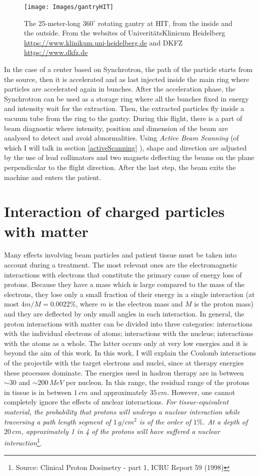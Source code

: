 \documentclass[12pt, a4paper, twoside]{book}
\begin{document}
\begin{figure}[t]
\texttt{[image: Images/gantryHIT]}
\caption{The 25-meter-long $360^\circ$ rotating gantry at HIT, from the inside and the outside. From the websites of Univerit\"atsKlinicum Heidelberg \url{https://www.klinikum.uni-heidelberg.de} and DKFZ \url{https://www.dkfz.de}}
\label{fig:HIT}
\end{figure}

In the case of a center based on Synchrotron, the path of the particle starts from the source, then it is accelerated and as last injected inside the main ring where particles are accelerated again in bunches. After the acceleration phase, the Synchrotron can be used as a storage ring where all the bunches fixed in energy and intensity wait for the extraction. Then, the extracted particles fly inside a vacuum tube from the ring to the gantry. During this flight, there is a part of beam diagnostic where intensity, position and dimension of the beam are analysed to detect and avoid abnormalities. Using \emph{Active Beam Scanning} (of which I will talk in section \ref{activeScanning} ), shape and direction are adjusted by the use of lead collimators and two magnets deflecting the beams on the plane perpendicular to the flight direction. After the last step, the beam exits the machine and enters the patient.

\section{Interaction of charged particles with matter}
Many effects involving beam particles and patient tissue must be taken into account during a treatment.
The most relevant ones are the electromagnetic interactions with electrons that constitute the primary cause of energy loss of protons. Because they have a mass which is large compared to the mass of the electrons, they lose only a small fraction of their energy in a single interaction (at most $4 m/M = 0.0022\%$, where $m$ is the electron mass and $M$ is the proton mass) and they are deflected by only small angles in each interaction.
In general, the proton interactions with matter can be divided into three categories: interactions with the individual electrons of atoms; interactions with the nucleus; interactions with the atoms as a whole. The latter occurs only at very low energies and it is beyond the aim of this work. In this work, I will explain the Coulomb interactions of the projectile with the target electrons and nuclei, since at therapy energies these processes dominate.  
The energies used in hadron therapy are in between $\sim30$ and $\sim200\,MeV$ per nucleon. 
In this range, the residual range of the protons in tissue is in between $1\,cm$ and approximately $35\,cm$. However, one cannot completely ignore the effects of nuclear interactions. \emph{For tissue-equivalent material, the probability that protons will undergo a nuclear interaction while traversing a path length segment of $1\,g/cm^{2}$ is of the order of $1\%$. At a depth of $20\,cm$, approximately 1 in 4 of the protons will have suffered a nuclear interaction}\footnote{Source: Clinical Proton Dosimetry - part 1, ICRU Report 59 (1998)}. 
\end{document}
